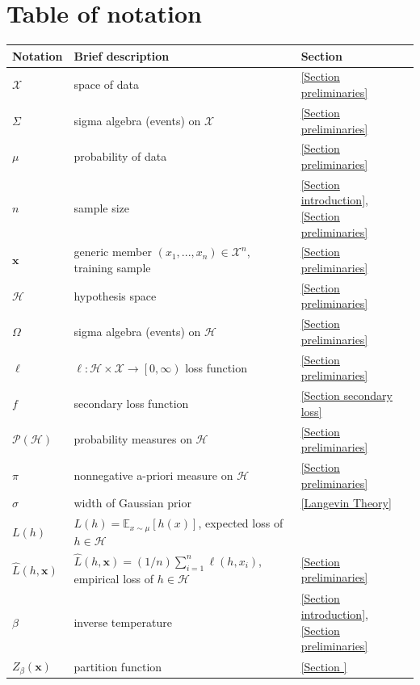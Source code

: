 \documentclass{article} %
\begin{document}
\section{Table of notation}
\begin{tabular}{l|l|l}
\hline
Notation & Brief description & Section \\ \hline
$\mathcal{X}$ & space of data & \ref{Section preliminaries} \\ \hline
$\Sigma $ & sigma algebra (events) on $\mathcal{X}$ & \ref{Section
preliminaries} \\ \hline
$\mu $ & probability of data & \ref{Section preliminaries} \\ \hline
$n$ & sample size & \ref{Section introduction}, \ref{Section preliminaries} \\ \hline
$\mathbf{x}$ & generic member $\left( x_{1},...,x_{n}\right) \in \mathcal{X}%
^{n}$, training sample & \ref{Section preliminaries} \\ \hline
$\mathcal{H}$ & hypothesis space & \ref{Section preliminaries} \\ \hline
$\Omega $ & sigma algebra (events) on $\mathcal{H}$ & \ref{Section
preliminaries} \\ \hline
$\ell $ & $\ell :\mathcal{H\times X\rightarrow }\left[ 0,\infty \right) $
loss function & \ref{Section preliminaries} \\ \hline
$f$ & secondary loss function & \ref{Section
secondary loss} \\ \hline
$\mathcal{P}\left( \mathcal{H}\right) $ & probability measures on $\mathcal{H%
}$ & \ref{Section preliminaries} \\ \hline
$\pi $ & nonnegative a-priori measure on $\mathcal{H}$ & \ref{Section
preliminaries} \\ \hline
$\sigma$ & width of Gaussian prior & \ref{Langevin Theory}
\\ \hline $L\left( h\right) $ & $L\left( h\right) =\mathbb{E}_{x\sim \mu }\left[
h\left( x\right) \right] $, expected loss of $h\in \mathcal{H}$ & \ref%
{Section preliminaries} \\ \hline
$\hat{L}\left( h,\mathbf{x}\right) $ & $\hat{L}\left( h,\mathbf{x}\right)
=\left( 1/n\right) \sum_{i=1}^{n}\ell \left( h,x_{i}\right) $, empirical
loss of $h\in \mathcal{H}$ & \ref{Section preliminaries} \\ \hline
$\beta $ & inverse temperature & \ref{Section introduction}, \ref{Section preliminaries} \\ \hline
$Z_{\beta }\left( \mathbf{x}\right) $ & partition function & \ref{Section
}
\end{tabular}
\end{document}

